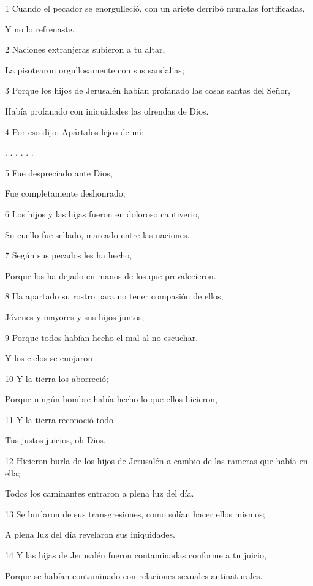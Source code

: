 \par 1 Cuando el pecador se enorgulleció, con un ariete derribó murallas fortificadas,
\par     Y no lo refrenaste.
\par 2 Naciones extranjeras subieron a tu altar,
\par     La pisotearon orgullosamente con sus sandalias;
\par 3 Porque los hijos de Jerusalén habían profanado las cosas santas del Señor,
\par     Había profanado con iniquidades las ofrendas de Dios.
\par 4 Por eso dijo: Apártalos lejos de mí;
\par     . . . . . .
\par 5 Fue despreciado ante Dios,
\par     Fue completamente deshonrado;
\par 6 Los hijos y las hijas fueron en doloroso cautiverio,
\par     Su cuello fue sellado, marcado entre las naciones.
\par 7 Según sus pecados les ha hecho,
\par     Porque los ha dejado en manos de los que prevalecieron.
\par 8 Ha apartado su rostro para no tener compasión de ellos,
\par     Jóvenes y mayores y sus hijos juntos;
\par 9 Porque todos habían hecho el mal al no escuchar.
\par     Y los cielos se enojaron
\par 10 Y la tierra los aborreció;
\par     Porque ningún hombre había hecho lo que ellos hicieron,
\par 11 Y la tierra reconoció todo
\par     Tus justos juicios, oh Dios.
\par 12 Hicieron burla de los hijos de Jerusalén a cambio de las rameras que había en ella;
\par     Todos los caminantes entraron a plena luz del día.
\par 13 Se burlaron de sus transgresiones, como solían hacer ellos mismos;
\par     A plena luz del día revelaron sus iniquidades.
\par 14 Y las hijas de Jerusalén fueron contaminadas conforme a tu juicio,
\par     Porque se habían contaminado con relaciones sexuales antinaturales.
